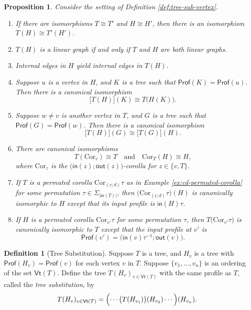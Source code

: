\documentclass{amsbook}
\numberwithin{section}{chapter}
\numberwithin{subsection}{section}
\numberwithin{equation}{section}
\theoremstyle{plain}
\newtheorem{proposition}[equation]{Proposition}
\theoremstyle{definition}
\newtheorem{definition}[equation]{Definition}
\newcommand{\Cor}{\mathrm{Cor}}
\newcommand{\Prof}{\mathsf{Prof}}
\newcommand{\profofg}{\Prof(G)}
\newcommand{\profofhv}{\Prof(H_v)}
\newcommand{\profofk}{\Prof(K)}
\newcommand{\profofu}{\Prof(u)}
\newcommand{\profofv}{\Prof(v)}
\newcommand{\profofw}{\Prof(w)}
\newcommand{\Vt}{\mathsf{Vt}}
\newcommand{\inv}[1]{{#1}^{-1}}
\newcommand{\uc}{\underline c}
\newcommand{\inp}{\mathsf{in}}
\newcommand{\out}{\mathsf{out}}
\newcommand{\andspace}{\quad\text{and}\quad}
\begin{document}
\begin{proposition}\label{prop:tree-sub-properties}
Consider the setting of Definition \ref{def:tree-sub-vertex}.
\begin{enumerate}
\item If there are isomorphisms $T \cong T'$ and $H \cong H'$, then there is an isomorphism $T(H) \cong T'(H')$.
\item $T(H)$ is a linear graph if and only if $T$ and $H$ are both linear graphs.
\item Internal edges in $H$ yield internal edges in $T(H)$.
\item Suppose $u$ is a vertex in $H$, and $K$ is a tree such that $\profofk = \profofu$.  Then there is a canonical isomorphism
\begin{equation}\label{treesubass1}
\bigl[T(H)\bigr](K) \cong T\bigl(H(K)\bigr).
\end{equation}
\item Suppose $w\not= v$ is another vertex in $T$, and $G$ is a tree such that $\profofg = \profofw$.  Then there is a canonical isomorphism 
\begin{equation}\label{treesubass2}
\bigl[T(H)\bigr](G) \cong \bigl[T(G)\bigr](H).
\end{equation}
\item There are canonical isomorphisms
\begin{equation}\label{treesubunity}
T(\Cor_v) \cong T \andspace \Cor_T(H) \cong H,
\end{equation}
where $\Cor_z$ is the $\bigl(\inp(z);\out(z)\bigr)$-corolla for $z \in \{v,T\}$.
\item If $T$ is a permuted corolla $\Cor_{(\uc;d)}\tau$ as in Example \ref{ex:cd-permuted-corolla} for some permutation $\tau \in \Sigma_{|\inp(T)|}$, then $\bigl(\Cor_{(\uc;d)}\tau\bigr)(H)$ is canonically isomorphic to $H$ except that its input profile is $\inp(H)\tau$.
\item If $H$ is a permuted corolla $\Cor_{v'}\tau$ for some permutation $\tau$, then $T\bigl(\Cor_{v'}\tau\bigr)$ is canonically isomorphic to $T$ except that the input profile at $v'$ is \[\Prof(v') = \bigl(\inp(v)\inv{\tau}; \out(v)\bigr).\]
\end{enumerate}\end{proposition}

\begin{definition}[Tree Substitution]\label{def:tree-substitution}
Suppose $T$ is a tree, and $H_v$ is a tree with $\profofhv=\profofv$ for each vertex $v$ in $T$.  Suppose $\{v_1,\ldots,v_n\}$ is an ordering of the set $\Vt(T)$.  Define the tree $T(H_v)_{v\in \Vt(T)}$ with the same profile as $T$, called the \emph{tree substitution}, by \[T(H_v)_{v\in \Vt(T)} = \Bigl(\cdots\bigl(T(H_{v_1})\bigr)(H_{v_2}) \cdots\Bigr)(H_{v_n}).\]  
\end{definition}
\end{document}
